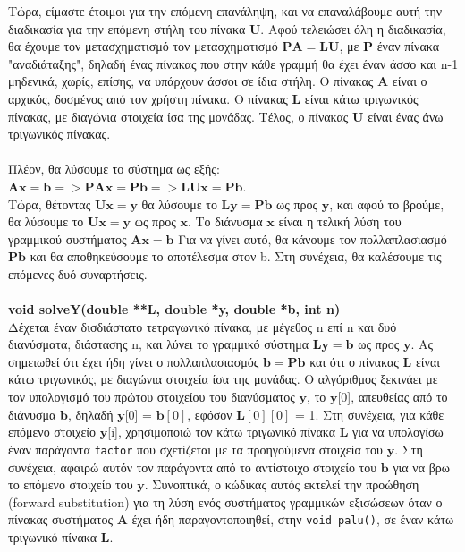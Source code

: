 \documentclass[a4paper, 14pt]{article}   %
\begin{document}
	Τώρα, είμαστε έτοιμοι για την επόμενη επανάληψη, και να επαναλάβουμε αυτή την διαδικασία για την επόμενη στήλη του πίνακα $\mathbf{U}$. Αφού τελειώσει όλη η διαδικασία, θα έχουμε τον μετασχηματισμό τον μετασχηματισμό $\mathbf{PA = LU}$, με $\mathbf{P}$ έναν πίνακα "αναδιάταξης", δηλαδή ένας πίνακας που στην κάθε γραμμή θα έχει έναν άσσο και n-1 μηδενικά, χωρίς, επίσης, να υπάρχουν άσσοι σε ίδια στήλη. Ο πίνακας $\mathbf{A}$ είναι ο αρχικός, δοσμένος από τον χρήστη πίνακα. Ο πίνακας $\mathbf{L}$ είναι κάτω τριγωνικός πίνακας, με διαγώνια στοιχεία ίσα της μονάδας. Τέλος, ο πίνακας $\mathbf{U}$ είναι ένας άνω τριγωνικός πίνακας.\\\\
Πλέον, θα λύσουμε το σύστημα ως εξής:\\
	 $\mathbf{Ax = b} => \mathbf{PAx = Pb} => \mathbf{LUx = Pb}$.\\
Τώρα, θέτοντας $\mathbf{Ux = y}$ θα λύσουμε το $\mathbf{Ly = Pb}$ ως προς $\mathbf{y}$, και αφού το βρούμε, θα λύσουμε το $\mathbf{Ux = y}$ ως προς $\mathbf{x}$. Το διάνυσμα $\mathbf{x}$ είναι η τελική λύση του γραμμικού συστήματος $\mathbf{Ax = b}$ Για να γίνει αυτό, θα κάνουμε τον πολλαπλασιασμό $\mathbf{Pb}$ και θα αποθηκεύσουμε το αποτέλεσμα στον b. Στη συνέχεια, θα καλέσουμε τις επόμενες δυό συναρτήσεις.\\\\
\textbf{void solveY(double **L, double *y, double *b, int n)}\\
Δέχεται έναν δισδιάστατο τετραγωνικό πίνακα, με μέγεθος n επί n και δυό διανύσματα, διάστασης n, και λύνει το γραμμικό σύστημα $\mathbf{Ly = b}$ ως προς $\mathbf{y}$. Ας σημειωθεί ότι έχει ήδη γίνει ο πολλαπλασιασμός $\mathbf{b = Pb}$ και ότι ο πίνακας $\mathbf{L}$ είναι κάτω τριγωνικός, με διαγώνια στοιχεία ίσα της μονάδας. Ο αλγόριθμος ξεκινάει με τον υπολογισμό του πρώτου στοιχείου του διανύσματος $\mathbf{y}$, το $\mathbf{y}$[0], απευθείας από το διάνυσμα $\mathbf{b}$, δηλαδή $\mathbf{y}$[0] = $\mathbf{b}[0]$, εφόσον $\mathbf{L}[0][0]$ = 1. Στη συνέχεια, για κάθε επόμενο στοιχείο $\mathbf{y}$[i], χρησιμοποιώ τον κάτω τριγωνικό πίνακα $\mathbf{L}$ για να υπολογίσω έναν παράγοντα \texttt{factor} που σχετίζεται με τα προηγούμενα στοιχεία του $\mathbf{y}$. Στη συνέχεια, αφαιρώ αυτόν τον παράγοντα από το αντίστοιχο στοιχείο του $\mathbf{b}$ για να βρω το επόμενο στοιχείο του $\mathbf{y}$. Συνοπτικά, ο κώδικας αυτός εκτελεί την προώθηση (forward substitution) για τη λύση ενός συστήματος γραμμικών εξισώσεων όταν ο πίνακας συστήματος $\mathbf{A}$ έχει ήδη παραγοντοποιηθεί, στην \texttt{void palu()}, σε έναν κάτω τριγωνικό πίνακα $\mathbf{L}$.\\\\
\end{document}
